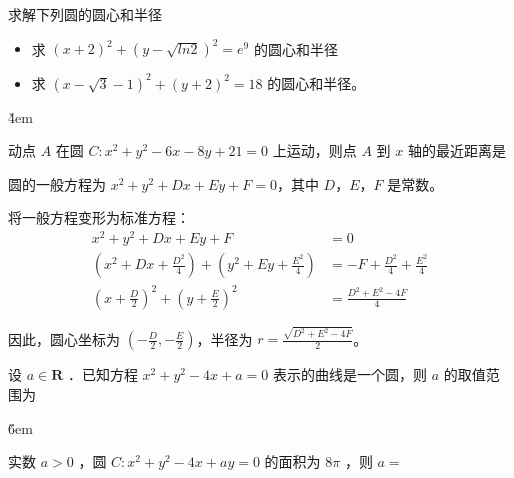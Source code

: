 \begin{example}
    求解下列圆的圆心和半径
    \begin{itemize}
        \item 求 $(x+2)^2+(y-\sqrt{ln2})^2=e^9$ 的圆心和半径
        \item 求 $(x-\sqrt{3}-1)^2+(y+2)^2=18$ 的圆心和半径。
    \end{itemize}

\end{example}

\v{4em}

\begin{example}
    动点 $A$ 在圆 $C: x^2+y^2-6 x-8 y+21=0$ 上运动，则点 $A$ 到 $x$ 轴的最近距离是 \underline{\qquad}
\end{example}

\begin{definition}[圆的一般方程]
    圆的一般方程为 $x^2+y^2+Dx+Ey+F=0$，其中 $D$，$E$，$F$ 是常数。

    将一般方程变形为标准方程：
    \begin{align}
        x^2+y^2+Dx+Ey+F                                                       & = 0                              \\
        \left(x^2+Dx+\frac{D^2}{4}\right) + \left(y^2+Ey+\frac{E^2}{4}\right) & = -F+\frac{D^2}{4}+\frac{E^2}{4} \\
        \left(x+\frac{D}{2}\right)^2 + \left(y+\frac{E}{2}\right)^2           & = \frac{D^2+E^2-4F}{4}
    \end{align}

    因此，圆心坐标为 $\left(-\frac{D}{2}, -\frac{E}{2}\right)$，半径为 $r = \frac{\sqrt{D^2+E^2-4F}}{2}$。
\end{definition}

\begin{example}
    设 $a \in \mathbf{R}$ ．已知方程 $x^2+y^2-4 x+a=0$ 表示的曲线是一个圆，则 $a$ 的取值范围为 \underline{\qquad}
\end{example}

\v{6em}

\begin{example}
    实数 $a>0$ ，圆 $C: x^2+y^2-4 x+a y=0$ 的面积为 $8 \pi$ ，则 $a=$ \underline{\qquad}
\end{example}

